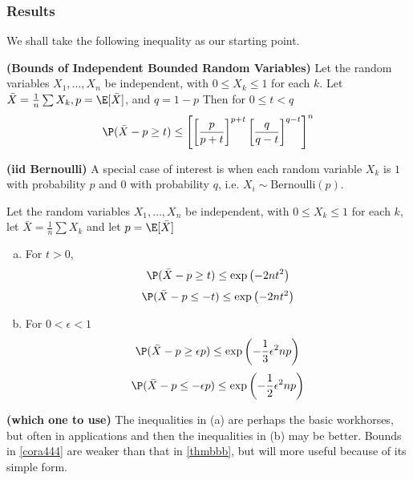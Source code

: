 \documentclass{article}
\newcommand{\bfs}[1]{\textbf{({#1})}}
\begin{document}
\subsubsection{Results}\label{ssecresult}
We shall take the following inequality as our starting point.
\begin{thma}{\bfs{Bounds of Independent Bounded Random Variables}}\label{thmbbb} Let the random variables $X _{1}, \ldots, X _{ n }$ be independent, with $0 \leq X_{k} \leq 1$ for each $k .$ Let $\bar{X}=\frac{1}{n} \sum X_{k}, p=\E[\bar{X}]$, and $q=1-p$ Then for $0 \leq t<q$
\begin{align}
 \P ( \bar{X} - p \geq t ) \leq\left[\left[\frac{ p }{ p + t }\right]^{ p + t }\left[\frac{ q }{ q - t }\right]^{ q - t }\right]^{ n }   \label{eqboundedind}
\end{align}
\end{thma}
\begin{rema}{\bfs{\gls{iid} Bernoulli}}
A special case of interest is when each random variable $X _{ k }$ is  $1$ with
probability $p$ and $0$ with probability $q$, i.e. $X_i\sim \mathrm {Bernoulli} \left(p\right)$.
\end{rema}
\begin{cora}\label{cora444}
Let the random variables $X _{1}, \ldots, X _{ n }$ be independent, with $0 \leq X_{k} \leq 1$ for each $k$, let $\bar{X}=\frac{1}{n} \sum X_{k}$ and let $p=\E[\bar{X}]$
\begin{enumerate}[(a)]
    \item For $t>0$,
\begin{align}
    \P ( \bar{X} - p \geq t) \leq \exp \left(-2 n t^{2}\right)\label{eq44a1}
\end{align}
\begin{align}
    \P (\bar{X}- p \leq-t) \leq \exp \left(-2 nt ^{2}\right)\label{eq44a2}
\end{align}
\item For $0<\epsilon<1$
\begin{align}
    \P (\bar{X}- p \geq \epsilon p ) \leq \exp \left(-\frac{1}{3} \epsilon^{2} np \right)\label{eq44b1}
\end{align}
\begin{align}
    \P ( \bar{X} - p \leq-\epsilon p ) \leq \exp \left(-\frac{1}{2} \epsilon^{2} np \right)\label{eq44b2}
\end{align}
\end{enumerate}
\end{cora} 
\begin{rema}{\bfs{which one to use}}
The inequalities in (a) are perhaps the basic workhorses, but often  in applications and then the inequalities in (b) may be better. Bounds in \cref{cora444} are weaker than that in \cref{thmbbb}, but will more useful because of its simple form.
\end{rema}
\end{document}
